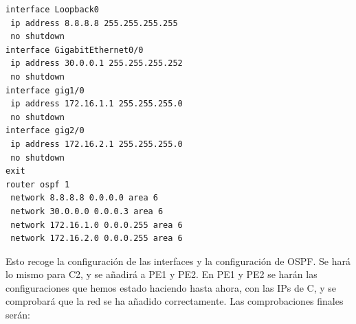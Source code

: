 \documentclass{article}
\begin{document}
\begin{verbatim}
interface Loopback0
 ip address 8.8.8.8 255.255.255.255
 no shutdown
interface GigabitEthernet0/0
 ip address 30.0.0.1 255.255.255.252
 no shutdown
interface gig1/0
 ip address 172.16.1.1 255.255.255.0
 no shutdown
interface gig2/0
 ip address 172.16.2.1 255.255.255.0
 no shutdown
exit
router ospf 1
 network 8.8.8.8 0.0.0.0 area 6
 network 30.0.0.0 0.0.0.3 area 6
 network 172.16.1.0 0.0.0.255 area 6
 network 172.16.2.0 0.0.0.255 area 6

\end{verbatim}

Esto recoge la configuración de las interfaces y la configuración de OSPF. Se hará lo mismo para C2, y se añadirá a PE1 y PE2. En PE1 y PE2 se harán las configuraciones que hemos estado haciendo hasta ahora, con las IPs de C, y se comprobará que la red se ha añadido correctamente.
Las comprobaciones finales serán:
\end{document}
